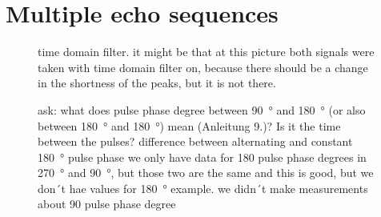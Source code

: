 \section{Multiple echo sequences}
\label{sec:Multipleechosequences}


\begin{figure}[H]
    \centering
    
    \caption[]{time domain filter. it might be that at this picture both signals were taken with time domain filter on, because there should be a change in the shortness of the peaks, but it is not there.}
    \label{fig:timedomain}
\end{figure}
\begin{figure}[H]
    \centering
    
    \caption[]{ask: what does pulse phase degree between \SI{90}{\degree} and \SI{180}{\degree} (or also between \SI{180}{\degree} and \SI{180}{\degree}) mean (Anleitung 9.)? Is it the time between the pulses? \newline
    difference between alternating and constant \SI{180}{\degree} pulse phase\newline
    we only have data for 180 pulse phase degrees in \SI{270}{\degree} and \SI{90}{\degree}, but those two are the same and this is good, but we don´t hae values for \SI{180}{\degree} example.\newline
    we didn´t make measurements about 90 pulse phase degree}
    \label{fig:180pulsephasedegree}
\end{figure}
